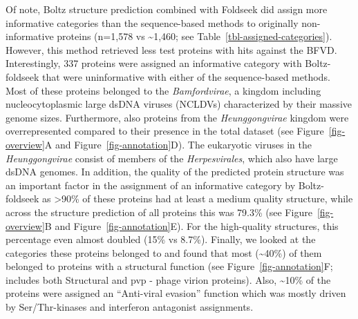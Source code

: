 \documentclass[
  sn-nature,
]{sn-jnl}
\begin{document}
Of note, Boltz structure prediction combined with Foldseek did assign
more informative categories than the sequence-based methods to
originally non-informative proteins (n=1,578 vs \textasciitilde1,460;
see Table~\ref{tbl-assigned-categories}). However, this method retrieved
less test proteins with hits against the BFVD. Interestingly, 337
proteins were assigned an informative category with Boltz-foldseek that
were uninformative with either of the sequence-based methods. Most of
these proteins belonged to the \emph{Bamfordvirae}, a kingdom including
nucleocytoplasmic large dsDNA viruses (NCLDVs) characterized by their
massive genome sizes. Furthermore, also proteins from the
\emph{Heunggongvirae} kingdom were overrepresented compared to their
presence in the total dataset (see Figure~\ref{fig-overview}A and
Figure~\ref{fig-annotation}D). The eukaryotic viruses in the
\emph{Heunggongvirae} consist of members of the \emph{Herpesvirales},
which also have large dsDNA genomes. In addition, the quality of the
predicted protein structure was an important factor in the assignment of
an informative category by Boltz-foldseek as \textgreater90\% of these
proteins had at least a medium quality structure, while across the
structure prediction of all proteins this was 79.3\% (see
Figure~\ref{fig-overview}B and Figure~\ref{fig-annotation}E). For the
high-quality structures, this percentage even almost doubled (15\% vs
8.7\%). Finally, we looked at the categories these proteins belonged to
and found that most (\textasciitilde40\%) of them belonged to proteins
with a structural function (see Figure~\ref{fig-annotation}F; includes
both Structural and pvp - phage virion proteins). Also,
\textasciitilde10\% of the proteins were assigned an ``Anti-viral
evasion'' function which was mostly driven by Ser/Thr-kinases and
interferon antagonist assignments.
\end{document}
